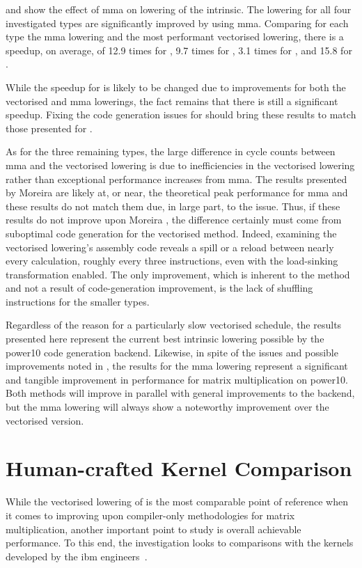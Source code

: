 \documentclass[\main/thesis.tex]{subfiles}
\begin{document}
 and  show the effect of \gls{mma} on \gls{lowering} of the  \gls{intrinsic}.
The \gls{lowering} for all four investigated types are significantly improved by using \gls{mma}.
Comparing for each type the \gls{mma} \gls{lowering} and the most performant vectorised \gls{lowering}, there is a speedup, on average, of 12.9 times for , 9.7 times for , 3.1 times for , and 15.8 for .

While the speedup for  is likely to be changed due to improvements for both the vectorised and \gls{mma} \glspl{lowering}, the fact remains that there is still a significant speedup.
Fixing the code generation issues for  should bring these results to match those presented for .

As for the three remaining types, the large difference in cycle counts between \gls{mma} and the vectorised \gls{lowering} is due to inefficiencies in the vectorised \gls{lowering} rather than exceptional performance increases from \gls{mma}.
The results presented by Moreira \etal are likely at, or near, the theoretical peak performance for \gls{mma} and these results do not match them due, in large part, to the  issue.
Thus, if these results do not improve upon Moreira \etal, the difference certainly must come from suboptimal code generation for the vectorised method.
Indeed, examining the vectorised \gls{lowering}'s assembly code reveals a \gls{spill} or a reload between nearly every calculation, roughly every three instructions, even with the load-sinking transformation enabled.
The only improvement, which is inherent to the method and not a result of code-generation improvement, is the lack of shuffling instructions for the smaller types.

Regardless of the reason for a particularly slow vectorised schedule, the results presented here represent the current best \gls{intrinsic} \gls{lowering} possible by the \gls{power10} code generation backend.
Likewise, in spite of the issues and possible improvements noted in , the results for the \gls{mma} \gls{lowering} represent a significant and tangible improvement in performance for matrix multiplication on \gls{power10}.
Both methods will improve in parallel with general improvements to the backend, but the \gls{mma} \gls{lowering} will always show a noteworthy improvement over the vectorised version.

\section{Human-crafted Kernel Comparison}
While the vectorised \gls{lowering} of  is the most comparable point of reference when it comes to improving upon compiler-only methodologies for matrix multiplication, another important point to study is overall achievable performance.
To this end, the investigation looks to comparisons with the kernels developed by the \gls{ibm} engineers~\autocite{moreira2021matrix}.
\end{document}
